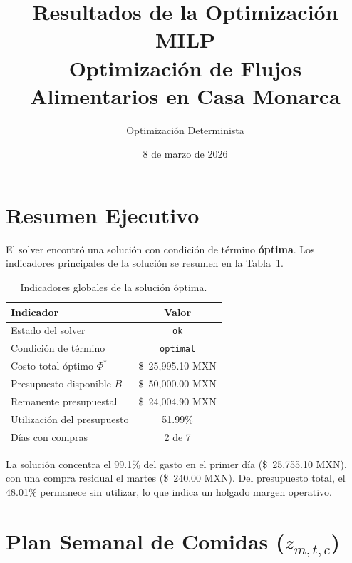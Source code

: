 \documentclass[12pt, a4paper]{article}
\title{\textbf{Resultados de la Optimización MILP}\\
\large Optimización de Flujos Alimentarios en Casa Monarca}
\author{Optimización Determinista}
\date{8 de marzo de 2026}
\begin{document}
\maketitle
\tableofcontents
\newpage

\section{Resumen Ejecutivo}

El solver encontró una solución con condición de término \textbf{óptima}. Los indicadores
principales de la solución se resumen en la Tabla~\ref{tab:resumen}.

\begin{table}[h!]
\centering
\renewcommand{\arraystretch}{1.3}
\begin{tabular}{lc}
\toprule
\textbf{Indicador} & \textbf{Valor} \\
\midrule
Estado del solver              & \texttt{ok} \\
Condición de término           & \texttt{optimal} \\
Costo total óptimo $\Phi^*$    & \$~25{,}995.10 MXN \\
Presupuesto disponible $B$     & \$~50{,}000.00 MXN \\
Remanente presupuestal         & \$~24{,}004.90 MXN \\
Utilización del presupuesto    & 51.99\% \\
Días con compras               & 2 de 7 \\
\bottomrule
\end{tabular}
\caption{Indicadores globales de la solución óptima.}
\label{tab:resumen}
\end{table}

La solución concentra el 99.1\% del gasto en el primer día (\$~25{,}755.10 MXN),
con una compra residual el martes (\$~240.00 MXN). Del presupuesto total, el
48.01\% permanece sin utilizar, lo que indica un holgado margen operativo.

\section{Plan Semanal de Comidas ($z_{m,t,c}$)}
\end{document}
